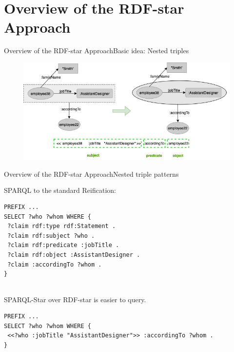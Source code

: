 \documentclass[aspectratio=169]{beamer}
\begin{document}
\section{Overview of the RDF-star Approach}
\begin{frame}{Overview of the RDF-star Approach}{Basic idea: Nested triples}
    \begin{figure}
        \centering
        \includegraphics[scale=0.5]{lecture/images/Example-2-To-Nested.png}
    \end{figure}
\end{frame}

\begin{frame}[fragile]{Overview of the RDF-star Approach}{Nested triple patterns}
\vspace{2mm}
\begin{minipage}{0.8\textwidth}
SPARQL to the standard Reification:
\begin{lstlisting}[language=SPARQL,basicstyle=\ttfamily\footnotesize]
PREFIX ...
SELECT ?who ?whom WHERE {
 ?claim rdf:type rdf:Statement .
 ?claim rdf:subject ?who .
 ?claim rdf:predicate :jobTitle .
 ?claim rdf:object :AssistantDesigner .
 ?claim :accordingTo ?whom .
}
\end{lstlisting}
\end{minipage}
\begin{minipage}{0.8\textwidth}
\centering
\end{minipage}
\\SPARQL-Star over RDF-star is easier to query.
\begin{minipage}{0.8\textwidth}
\begin{lstlisting}[language=SPARQL,basicstyle=\ttfamily\footnotesize]
PREFIX ...
SELECT ?who ?whom WHERE {
 <<?who :jobTitle "AssistantDesigner">> :accordingTo ?whom .
}
\end{lstlisting}
\end{minipage}
\end{frame}
\end{document}
